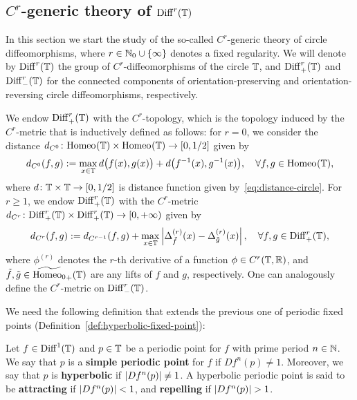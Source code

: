 \subsection{$C^r$-generic theory of $\mathrm{Diff}_{}^{r}(\mathbb{T})$}
\label{sec:Cr-generic-theory-circle}

In this section we start the study of the so-called $C^r$-generic theory of circle diffeomorphisms, where $r\in\mathbb{N}_0\cup\{\infty\}$ denotes a fixed regularity. We will denote by $\mathrm{Diff}_{}^{r}(\mathbb{T})$ the group of $C^r$-diffeomorphisms of the circle $\mathbb{T}$, and $\mathrm{Diff}_{+}^{r}(\mathbb{T})$ and $\mathrm{Diff}_{-}^{r}(\mathbb{T})$ for the connected components of orientation-preserving and orientation-reversing circle diffeomorphisms, respectively.

We endow $\mathrm{Diff}_{+}^{r}(\mathbb{T})$ with the $C^r$-topology, which is the topology induced by the $C^r$-metric that is inductively defined as follows: for $r=0$, we consider the distance $d_{C^0}\colon\mathrm{Homeo}_{}(\mathbb{T})\times\mathrm{Homeo}_{}(\mathbb{T})\to[0,1/2]$ given by
\begin{displaymath}
  d_{C^0}(f,g):=\max_{x\in\mathbb{T}} d\big(f(x),g(x)\big)+d\big(f^{-1}(x),g^{-1}(x)\big), \quad\forall f,g\in\mathrm{Homeo}_{}(\mathbb{T}),
\end{displaymath}
where $d\colon\mathbb{T}\times\mathbb{T}\to[0,1/2]$ is distance function given by~\eqref{eq:distance-circle}. For $r\geq 1$, we endow $\mathrm{Diff}_{+}^{r}(\mathbb{T})$ with the $C^r$-metric $d_{C^r}\colon\mathrm{Diff}_{+}^{r}(\mathbb{T})\times\mathrm{Diff}_{+}^{r}(\mathbb{T})\to[0,+\infty)$ given by
\begin{equation}
  \label{eq:Cr-metric-circle}
  d_{C^r}(f,g):=d_{C^{r-1}}(f,g)+\max_{x\in\mathbb{T}} \left\lvert{\Delta_{\tilde f}^{(r)}(x)-\Delta_{\tilde g}^{(r)}(x)}\right\rvert, \quad\forall f,g\in\mathrm{Diff}_{+}^{r}(\mathbb{T}),
\end{equation}
where $\phi^{(r)}$ denotes the $r$-th derivative of a function $\phi\in C^r(\mathbb{T},\mathbb{R})$, and $\tilde f,\tilde g\in\widetilde{\mathrm{Homeo}_0}_+(\mathbb{T})$ are any lifts of $f$ and $g$, respectively. One can analogously define the $C^r$-metric on $\mathrm{Diff}_{-}^{r}(\mathbb{T})$.

We need the following definition that extends the previous one of periodic fixed points (Definition~\ref{def:hyperbolic-fixed-point}):
\begin{definition}
  Let $f\in\mathrm{Diff}_{}^{1}(\mathbb{T})$ and $p\in\mathbb{T}$ be a periodic point for $f$ with prime period $n\in\mathbb{N}$. We say that $p$ is a \textbf{simple periodic point} for $f$ if $Df^n(p)\neq 1$. Moreover, we say that $p$ is \textbf{hyperbolic} if $\left\lvert{Df^n(p)}\right\rvert\neq 1$. A hyperbolic periodic point is said to be \textbf{attracting} if $\left\lvert{Df^n(p)}\right\rvert<1$, and \textbf{repelling} if $\left\lvert{Df^n(p)}\right\rvert>1$.
\end{definition}

